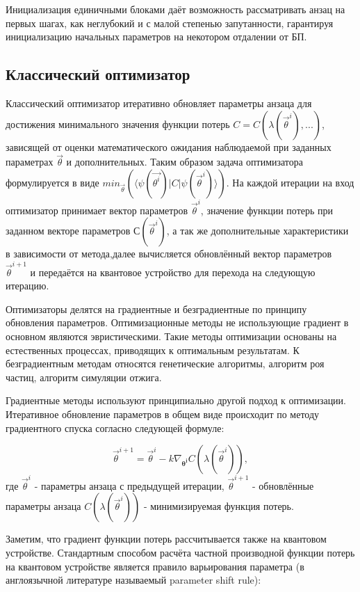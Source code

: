 \documentclass[14pt]{extarticle}
\begin{document}
\qquad Инициализация единичными блоками даёт возможность рассматривать анзац на первых шагах, как неглубокий и с малой степенью запутанности, гарантируя инициализацию начальных параметров на некотором отдалении от БП. 

\subsection{Классический оптимизатор}

\qquad Классический оптимизатор итеративно обновляет параметры анзаца для достижения минимального значения функции потерь $ C = C(\lambda(\vec \theta^{i}), ...)$, зависящей от оценки математического ожидания наблюдаемой при заданных параметрах $\vec \theta$  и дополнительных.  Таким образом задача оптимизатора формулируется в виде  $min_{\vec \theta} ( \langle \psi(\vec{\theta^{i}}) |C|\psi(\vec{\theta}^{i})\rangle )$. На каждой итерации на вход оптимизатор принимает вектор параметров $\vec \theta^{i} $, значение функции потерь при заданном векторе  параметров $С(\vec \theta^{i}) $, а так же дополнительные характеристики в зависимости от метода,далее вычисляется обновлённый вектор параметров $\vec \theta^{i+1} $ и передаётся на квантовое устройство для перехода на следующую итерацию.

\qquad Оптимизаторы делятся на градиентные и безградиентные по принципу обновления параметров. Оптимизационные методы не использующие градиент в основном являются эвристическими. Такие методы оптимизации основаны на естественных процессах, приводящих к оптимальным результатам. К безградиентным методам относятся генетические алгоритмы, алгоритм роя частиц, алгоритм симуляции отжига.


\qquad Градиентные методы используют принципиально другой подход к оптимизации. Итеративное обновление параметров в общем виде происходит по методу градиентного спуска согласно следующей формуле:

\begin{equation}
\vec{\theta}^{i+1} = \vec{\theta}^{i} - k \nabla_{\mathbf{\theta^{i}}} C(\lambda (\vec \theta^{i})),
\end{equation} где $\vec{\theta}^{i}$ - параметры анзаца с предыдущей итерации, $\vec{\theta}^{i+1}$ - обновлённые параметры анзаца $C(\lambda (\vec \theta^{i}))$ - минимизируемая функция потерь.
 

\qquad Заметим, что градиент функции потерь рассчитывается также на квантовом устройстве. Стандартным способом расчёта частной производной функции потерь на квантовом устройстве является правило варьирования параметра (в англоязычной литературе называемый parameter shift rule):
\end{document}
